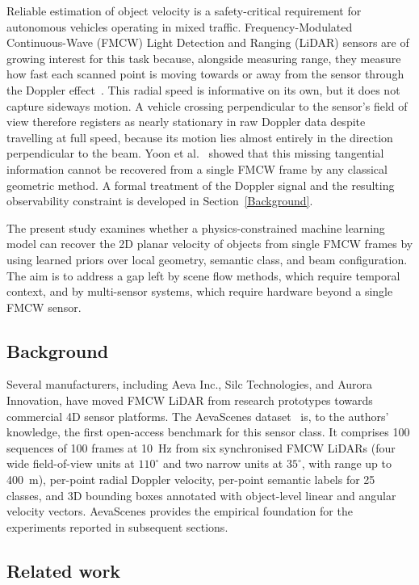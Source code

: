 \documentclass[a4paper,12pt]{article}
\begin{document}
Reliable estimation of object velocity is a safety-critical requirement for autonomous vehicles operating in mixed traffic. Frequency-Modulated Continuous-Wave (FMCW) Light Detection and Ranging (LiDAR) sensors are of growing interest for this task because, alongside measuring range, they measure how fast each scanned point is moving towards or away from the sensor through the Doppler effect~\cite{royo2019overview}. This radial speed is informative on its own, but it does not capture sideways motion. A vehicle crossing perpendicular to the sensor's field of view therefore registers as nearly stationary in raw Doppler data despite travelling at full speed, because its motion lies almost entirely in the direction perpendicular to the beam. Yoon et al.~\cite{yoon2023needforspeed} showed that this missing tangential information cannot be recovered from a single FMCW frame by any classical geometric method. A formal treatment of the Doppler signal and the resulting observability constraint is developed in Section~\ref{Background}.

The present study examines whether a physics-constrained machine learning model can recover the 2D planar velocity of objects from single FMCW frames by using learned priors over local geometry, semantic class, and beam configuration. The aim is to address a gap left by scene flow methods, which require temporal context, and by multi-sensor systems, which require hardware beyond a single FMCW sensor.

\subsection{Background}

Several manufacturers, including Aeva Inc., Silc Technologies, and Aurora Innovation, have moved FMCW LiDAR from research prototypes towards commercial 4D sensor platforms. The AevaScenes dataset~\cite{aeva2025aevascenes} is, to the authors' knowledge, the first open-access benchmark for this sensor class. It comprises 100 sequences of 100 frames at 10~Hz from six synchronised FMCW LiDARs (four wide field-of-view units at $110^{\circ}$ and two narrow units at $35^{\circ}$, with range up to 400~m), per-point radial Doppler velocity, per-point semantic labels for 25 classes, and 3D bounding boxes annotated with object-level linear and angular velocity vectors. AevaScenes provides the empirical foundation for the experiments reported in subsequent sections.

\subsection{Related work}
\end{document}
